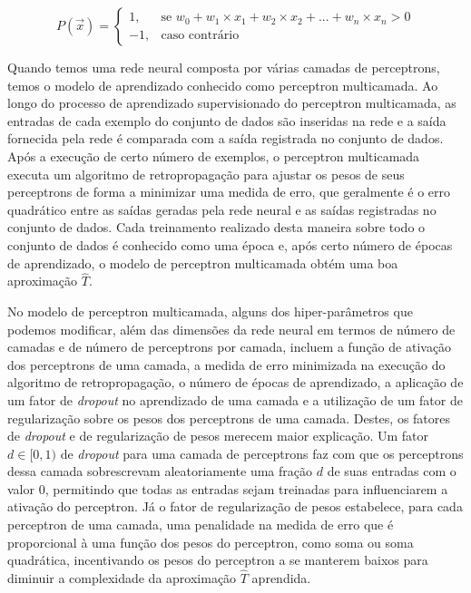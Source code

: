 \begin{equation} \label{eq:perceptron}
  P(\vec{x}) =
  \begin{cases}
    1, & \text{se } w_{0} + w_{1} \times x_{1} + w_{2} \times x_{2} + ... + w_{n} \times x_{n} > 0\\
    -1, & \text{caso contrário}
  \end{cases}
\end{equation}

Quando temos uma rede neural composta por várias camadas de perceptrons, temos o modelo de aprendizado conhecido como perceptron multicamada. Ao longo do processo de aprendizado supervisionado do perceptron multicamada, as entradas de cada exemplo do conjunto de dados são inseridas na rede e a saída fornecida pela rede é comparada com a saída registrada no conjunto de dados. Após a execução de certo número de exemplos, o perceptron multicamada executa um algoritmo de retropropagação para ajustar os pesos de seus perceptrons de forma a minimizar uma medida de erro, que geralmente é o erro quadrático entre as saídas geradas pela rede neural e as saídas registradas no conjunto de dados\cite[p.97]{machine_learning}. Cada treinamento realizado desta maneira sobre todo o conjunto de dados é conhecido como uma época e, após certo número de épocas de aprendizado, o modelo de perceptron multicamada obtém uma boa aproximação $\hat{T}$.

No modelo de perceptron multicamada, alguns dos hiper-parâmetros que podemos modificar, além das dimensões da rede neural em termos de número de camadas e de número de perceptrons por camada, incluem a função de ativação dos perceptrons de uma camada, a medida de erro minimizada na execução do algoritmo de retropropagação, o número de épocas de aprendizado, a aplicação de um fator de \textit{dropout} no aprendizado de uma camada e a utilização de um fator de regularização sobre os pesos dos perceptrons de uma camada. Destes, os fatores de \textit{dropout} e de regularização de pesos merecem maior explicação. Um fator $d \in [0, 1)$ de \textit{dropout} para uma camada de perceptrons faz com que os perceptrons dessa camada sobrescrevam aleatoriamente uma fração $d$ de suas entradas com o valor 0, permitindo que todas as entradas sejam treinadas para influenciarem a ativação do perceptron. Já o fator de regularização de pesos estabelece, para cada perceptron de uma camada, uma penalidade na medida de erro que é proporcional à uma função dos pesos do perceptron, como soma ou soma quadrática, incentivando os pesos do perceptron a se manterem baixos para diminuir a complexidade da aproximação $\hat{T}$ aprendida\cite[p.111]{machine_learning}.

